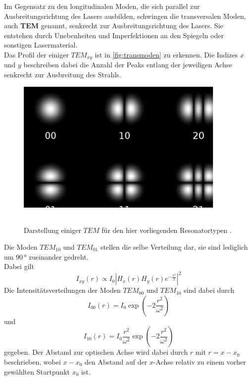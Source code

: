 Im Gegensatz zu den longitudinalen Moden, die sich parallel zur Ausbreitungsrichtung des Lasers ausbilden, schwingen die transversalen Moden, auch \textbf{TEM} genannt, senkrecht zur Ausbreitungsrichtung des Lasers.
Sie entstehen durch Unebenheiten und Imperfektionen an den Spiegeln oder sonstigen Lasermaterial. \\
Das Profil der einiger $TEM_{x y}$ ist in \autoref{fig:transmoden} zu erkennen.
Die Indizes $x$ und $y$ beschreiben dabei die Anzahl der Peaks entlang der jeweiligen Achse senkrecht zur Ausbreitung des Strahls.

\begin{figure}[H]
    \centering
    \includegraphics{figures/TransversaleModen.pdf}
    \caption{Darstellung einiger $TEM$ für den hier vorliegenden Resonatortypen \cite{transmode}.}
    \label{fig:transmoden}
\end{figure}

Die Moden $TEM_{10}$ und $TEM_{01}$ stellen die selbe Verteilung dar, sie sind lediglich um $90 \,°$ zueinander gedreht. \\
Dabei gilt
\begin{equation*}
    I_{xy} (r) \propto I_0 \left| H_x(r) H_y(r) e^{-\frac{x^2}{2}} \right|^2 
\end{equation*}
Die Intensitätsverteilungen der Moden $TEM_{00}$ und $TEM_{10}$ sind dabei durch
\begin{equation}
    I_{00} (r) = I_0 \exp \left(-2\frac{r^2}{\omega^2} \right)
    \label{eq:int00}
\end{equation}
und
\begin{equation}
    I_{10} (r) = I_0 \frac{r^2}{\omega^2} \exp \left(-2\frac{r^2}{\omega^2}\right)
    \label{eq:int10}
\end{equation}
gegeben.
Der Abstand zur optischen Achse wird dabei durch $r$ mit $r = x - x_0$ beschrieben, wobei $x - x_0$ den Abstand auf der $x$-Achse relativ zu einem vorher gewählten Startpunkt $x_0$ ist. \\

